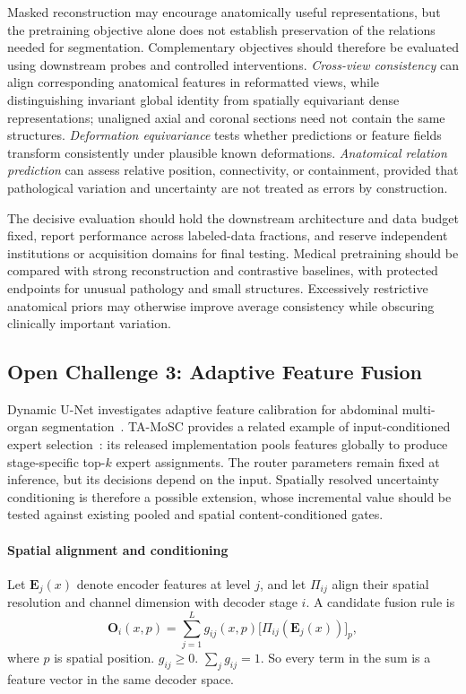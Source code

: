 \documentclass[5p,times,authoryear]{elsarticle}
\begin{document}
Masked reconstruction may encourage anatomically useful representations, but the pretraining objective alone does not establish preservation of the relations needed for segmentation. Complementary objectives should therefore be evaluated using downstream probes and controlled interventions. \emph{Cross-view consistency} can align corresponding anatomical features in reformatted views, while distinguishing invariant global identity from spatially equivariant dense representations; unaligned axial and coronal sections need not contain the same structures. \emph{Deformation equivariance} tests whether predictions or feature fields transform consistently under plausible known deformations. \emph{Anatomical relation prediction} can assess relative position, connectivity, or containment, provided that pathological variation and uncertainty are not treated as errors by construction.

The decisive evaluation should hold the downstream architecture and data budget fixed, report performance across labeled-data fractions, and reserve independent institutions or acquisition domains for final testing. Medical pretraining should be compared with strong reconstruction and contrastive baselines, with protected endpoints for unusual pathology and small structures. Excessively restrictive anatomical priors may otherwise improve average consistency while obscuring clinically important variation.

\subsection{Open Challenge 3: Adaptive Feature Fusion}
\label{subsec:adaptive_fusion}

Dynamic U-Net investigates adaptive feature calibration for abdominal multi-organ segmentation~\citep{yang2025dynamic}. TA-MoSC provides a related example of input-conditioned expert selection~\citep{luo2025tamosc_verified,luo2025tamosc_code_verified}: its released implementation pools features globally to produce stage-specific top-$k$ expert assignments. The router parameters remain fixed at inference, but its decisions depend on the input. Spatially resolved uncertainty conditioning is therefore a possible extension, whose incremental value should be tested against existing pooled and spatial content-conditioned gates.

\paragraph{Spatial alignment and conditioning}
Let $\mathbf{E}_j(x)$ denote encoder features at level $j$, and let $\Pi_{ij}$ align their spatial resolution and channel dimension with decoder stage $i$. A candidate fusion rule is
\begin{equation}
  \mathbf{O}_i(x,p)=\sum_{j=1}^{L}g_{ij}(x,p)
  \bigl[\Pi_{ij}(\mathbf{E}_j(x))\bigr]_p,
\end{equation}
where $p$ is spatial position. $g_{ij}\geq0$. $\sum_jg_{ij}=1$. So every term in the sum is a feature vector in the same decoder space.
\end{document}
